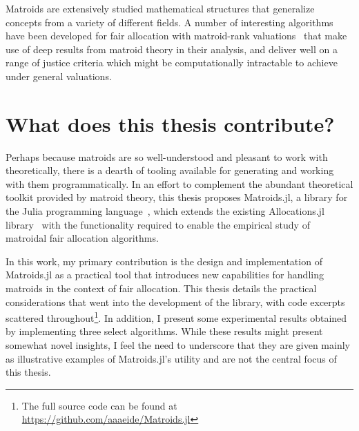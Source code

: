Matroids are extensively studied mathematical structures that generalize concepts from a variety of different fields. A number of interesting algorithms have been developed for fair allocation with matroid-rank valuations~\cite{barman2020fair,barman2021existence,Benabbou_2020,benabbou-2021,viswanathan2023yankee} that make use of deep results from matroid theory in their analysis, and deliver well on a range of justice criteria which might be computationally intractable to achieve under general valuations. 

\section*{What does this thesis contribute?}
Perhaps because matroids are so well-understood and pleasant to work with theoretically, there is a dearth of tooling available for generating and working with them programmatically. In an effort to complement the abundant theoretical toolkit provided by matroid theory, this thesis proposes Matroids.jl, a library for the Julia programming language~\cite{bezanson2017julia}, which extends the existing Allocations.jl library~\cite{Hetland_Allocations_jl_2022} with the functionality required to enable the empirical study of matroidal fair allocation algorithms. 

In this work, my primary contribution is the design and implementation of Matroids.jl as a practical tool that introduces new capabilities for handling matroids in the context of fair allocation. This thesis details the practical considerations that went into the development of the library, with code excerpts scattered throughout\footnote{The full source code can be found at \href{https://github.com/aaaeide/Matroids.jl}{https://github.com/aaaeide/Matroids.jl}}. In addition, I present some experimental results obtained by implementing three select algorithms. While these results might present somewhat novel insights, I feel the need to underscore that they are given mainly as illustrative examples of Matroids.jl's utility and are not the central focus of this thesis. 

